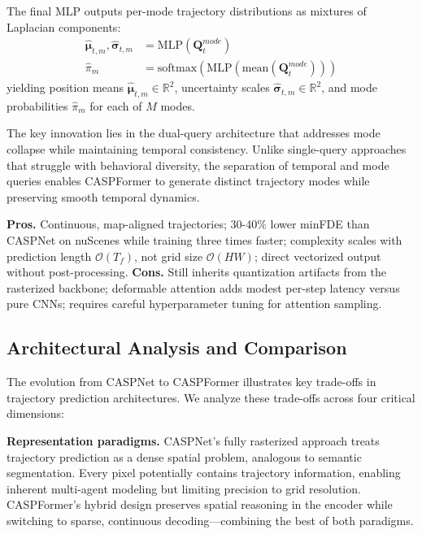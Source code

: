 \begin{description}[leftmargin=1em,itemsep=2pt]
\begin{description}[leftmargin=1em,itemsep=2pt]
\item[Mixture-density head.] The final MLP outputs per-mode trajectory distributions as mixtures of Laplacian components:
\begin{equation}
\label{eq:mixture_output}
\begin{aligned}
\hat{\boldsymbol{\mu}}_{t,m}, \hat{\boldsymbol{\sigma}}_{t,m} &= \text{MLP}(\mathbf{Q}_t^{mode}) \\
\hat{\pi}_m &= \text{softmax}(\text{MLP}(\text{mean}(\mathbf{Q}_t^{mode})))
\end{aligned}
\end{equation}
yielding position means \(\hat{\boldsymbol{\mu}}_{t,m} \in \mathbb{R}^2\), uncertainty scales \(\hat{\boldsymbol{\sigma}}_{t,m} \in \mathbb{R}^2\), and mode probabilities \(\hat{\pi}_m\) for each of \(M\) modes.
\end{description}

The key innovation lies in the dual-query architecture that addresses mode collapse while maintaining temporal consistency. Unlike single-query approaches that struggle with behavioral diversity, the separation of temporal and mode queries enables CASPFormer to generate distinct trajectory modes while preserving smooth temporal dynamics.

\textbf{Pros.} Continuous, map-aligned trajectories; 30-40\% lower minFDE than CASPNet on nuScenes while training three times faster; complexity scales with prediction length \(\mathcal{O}(T_f)\), not grid size \(\mathcal{O}(HW)\); direct vectorized output without post-processing.
\textbf{Cons.} Still inherits quantization artifacts from the rasterized backbone; deformable attention adds modest per-step latency versus pure CNNs; requires careful hyperparameter tuning for attention sampling.

\subsection{Architectural Analysis and Comparison}
\label{ssec:comparison}

The evolution from CASPNet to CASPFormer illustrates key trade-offs in trajectory prediction architectures. We analyze these trade-offs across four critical dimensions:

\textbf{Representation paradigms.} CASPNet's fully rasterized approach treats trajectory prediction as a dense spatial problem, analogous to semantic segmentation. Every pixel potentially contains trajectory information, enabling inherent multi-agent modeling but limiting precision to grid resolution. CASPFormer's hybrid design preserves spatial reasoning in the encoder while switching to sparse, continuous decoding—combining the best of both paradigms.


\end{description}
